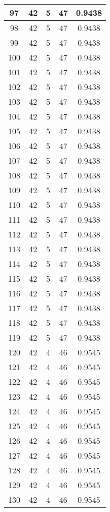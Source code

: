 \documentclass[letterpaper, 12pt]{article}
\begin{document}
\begin{longtable}{|c|c|c|c|c|}
\hline
97 & 42 & 5 & 47 & 0.9438 \\
\hline
98 & 42 & 5 & 47 & 0.9438 \\
\hline
99 & 42 & 5 & 47 & 0.9438 \\
\hline
100 & 42 & 5 & 47 & 0.9438 \\
\hline
101 & 42 & 5 & 47 & 0.9438 \\
\hline
102 & 42 & 5 & 47 & 0.9438 \\
\hline
103 & 42 & 5 & 47 & 0.9438 \\
\hline
104 & 42 & 5 & 47 & 0.9438 \\
\hline
105 & 42 & 5 & 47 & 0.9438 \\
\hline
106 & 42 & 5 & 47 & 0.9438 \\
\hline
107 & 42 & 5 & 47 & 0.9438 \\
\hline
108 & 42 & 5 & 47 & 0.9438 \\
\hline
109 & 42 & 5 & 47 & 0.9438 \\
\hline
110 & 42 & 5 & 47 & 0.9438 \\
\hline
111 & 42 & 5 & 47 & 0.9438 \\
\hline
112 & 42 & 5 & 47 & 0.9438 \\
\hline
113 & 42 & 5 & 47 & 0.9438 \\
\hline
114 & 42 & 5 & 47 & 0.9438 \\
\hline
115 & 42 & 5 & 47 & 0.9438 \\
\hline
116 & 42 & 5 & 47 & 0.9438 \\
\hline
117 & 42 & 5 & 47 & 0.9438 \\
\hline
118 & 42 & 5 & 47 & 0.9438 \\
\hline
119 & 42 & 5 & 47 & 0.9438 \\
\hline
120 & 42 & 4 & 46 & 0.9545 \\
\hline
121 & 42 & 4 & 46 & 0.9545 \\
\hline
122 & 42 & 4 & 46 & 0.9545 \\
\hline
123 & 42 & 4 & 46 & 0.9545 \\
\hline
124 & 42 & 4 & 46 & 0.9545 \\
\hline
125 & 42 & 4 & 46 & 0.9545 \\
\hline
126 & 42 & 4 & 46 & 0.9545 \\
\hline
127 & 42 & 4 & 46 & 0.9545 \\
\hline
128 & 42 & 4 & 46 & 0.9545 \\
\hline
129 & 42 & 4 & 46 & 0.9545 \\
\hline
130 & 42 & 4 & 46 & 0.9545 \\

\end{longtable}
\end{document}
